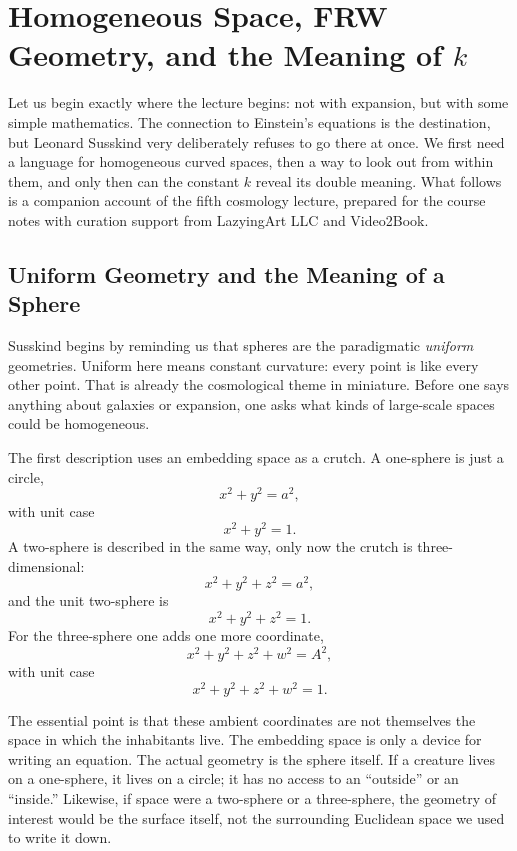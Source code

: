 \chapter{Homogeneous Space, FRW Geometry, and the Meaning of $k$}

Let us begin exactly where the lecture begins: not with expansion, but with some simple mathematics. The connection to Einstein's equations is the destination, but Leonard Susskind very deliberately refuses to go there at once. We first need a language for homogeneous curved spaces, then a way to look out from within them, and only then can the constant \(k\) reveal its double meaning. What follows is a companion account of the fifth cosmology lecture, prepared for the course notes with curation support from LazyingArt LLC and Video2Book.

\section{Uniform Geometry and the Meaning of a Sphere}

Susskind begins by reminding us that spheres are the paradigmatic \emph{uniform} geometries. Uniform here means constant curvature: every point is like every other point. That is already the cosmological theme in miniature. Before one says anything about galaxies or expansion, one asks what kinds of large-scale spaces could be homogeneous.

The first description uses an embedding space as a crutch. A one-sphere is just a circle,
\begin{equation}
x^2+y^2=a^2,
\end{equation}
with unit case
\begin{equation}
x^2+y^2=1.
\end{equation}
A two-sphere is described in the same way, only now the crutch is three-dimensional:
\begin{equation}
x^2+y^2+z^2=a^2,
\end{equation}
and the unit two-sphere is
\begin{equation}
x^2+y^2+z^2=1.
\end{equation}
For the three-sphere one adds one more coordinate,
\begin{equation}
x^2+y^2+z^2+w^2=A^2,
\end{equation}
with unit case
\begin{equation}
x^2+y^2+z^2+w^2=1.
\end{equation}

The essential point is that these ambient coordinates are not themselves the space in which the inhabitants live. The embedding space is only a device for writing an equation. The actual geometry is the sphere itself. If a creature lives on a one-sphere, it lives on a circle; it has no access to an ``outside'' or an ``inside.'' Likewise, if space were a two-sphere or a three-sphere, the geometry of interest would be the surface itself, not the surrounding Euclidean space we used to write it down.


